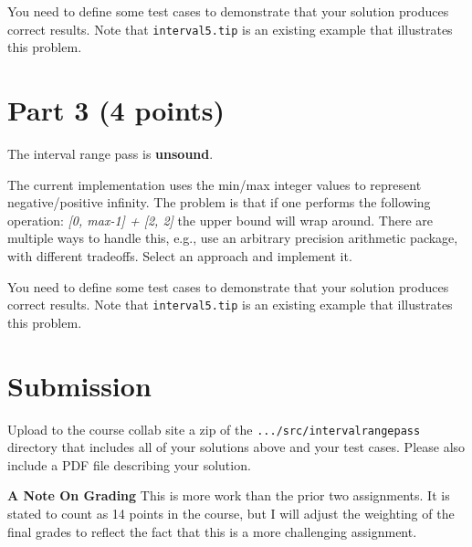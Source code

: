 \documentclass[12pt,letterpaper]{article}
\begin{document}
You need to define some test cases to demonstrate that your solution produces correct results.  Note that \texttt{interval5.tip} is an existing example that illustrates this problem.

\section*{Part 3 (4 points)}
The interval range pass is \textbf{unsound}.

The current implementation uses the min/max integer values to represent negative/positive infinity.  The problem is that if one performs the following operation: \textit{[0, max-1] + [2, 2]} the upper bound will wrap around.  There are multiple ways to handle this, e.g., use an arbitrary precision arithmetic package, with different tradeoffs.  Select an approach and implement it.

You need to define some test cases to demonstrate that your solution produces correct results.  Note that \texttt{interval5.tip} is an existing example that illustrates this problem.

\section*{Submission} 
Upload to the course collab site a zip of the \texttt{.../src/intervalrangepass} directory that includes all of your solutions above and your test cases.  Please also include a PDF file describing your solution.

\noindent \textbf{A Note On Grading} This is more work than the prior two assignments.  It is stated to count as 14 points in the course, but I will adjust the weighting of the final grades to reflect the fact that this is a more challenging assignment.
\end{document}
